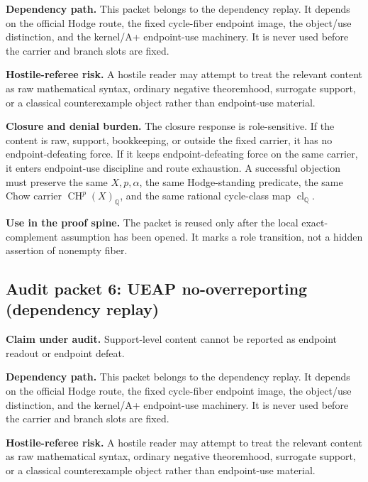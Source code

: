 \documentclass[11pt]{article}
\newcommand{\QQ}{\mathbb{Q}}
\newcommand{\CH}{\operatorname{CH}}
\newcommand{\clQ}{\operatorname{cl}_{\QQ}}
\begin{document}
\par\noindent\textbf{Dependency path.} This packet belongs to the dependency replay. It depends on the official Hodge route, the fixed cycle-fiber endpoint image, the object/use distinction, and the kernel/A+ endpoint-use machinery. It is never used before the carrier and branch slots are fixed.


\par\noindent\textbf{Hostile-referee risk.} A hostile reader may attempt to treat the relevant content as raw mathematical syntax, ordinary negative theoremhood, surrogate support, or a classical counterexample object rather than endpoint-use material.


\par\noindent\textbf{Closure and denial burden.} The closure response is role-sensitive. If the content is raw, support, bookkeeping, or outside the fixed carrier, it has no endpoint-defeating force. If it keeps endpoint-defeating force on the same carrier, it enters endpoint-use discipline and route exhaustion. A successful objection must preserve the same $X,p,\alpha$, the same Hodge-standing predicate, the same Chow carrier $\CH^p(X)_\QQ$, and the same rational cycle-class map $\clQ$.


\par\noindent\textbf{Use in the proof spine.} The packet is reused only after the local exact-complement assumption has been opened. It marks a role transition, not a hidden assertion of nonempty fiber.


\subsection{Audit packet 6: UEAP no-overreporting (dependency replay)}


\par\noindent\textbf{Claim under audit.} Support-level content cannot be reported as endpoint readout or endpoint defeat.


\par\noindent\textbf{Dependency path.} This packet belongs to the dependency replay. It depends on the official Hodge route, the fixed cycle-fiber endpoint image, the object/use distinction, and the kernel/A+ endpoint-use machinery. It is never used before the carrier and branch slots are fixed.


\par\noindent\textbf{Hostile-referee risk.} A hostile reader may attempt to treat the relevant content as raw mathematical syntax, ordinary negative theoremhood, surrogate support, or a classical counterexample object rather than endpoint-use material.
\end{document}

